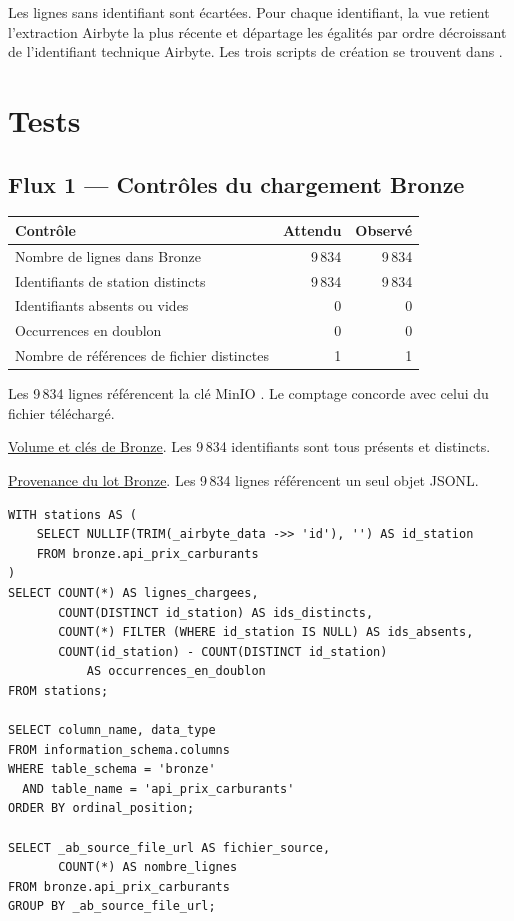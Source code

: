 \documentclass[11pt,a4paper]{article}
\newcommand{\preuve}[2]{%
  \href{https://github.com/MAHDIghr/projet_big_data_starter/blob/27cc8348f6737a75bb24a40d6d8cda3ae54996b3/preuves/#1}{\textcolor{encre}{\underline{#2}}}}
\begin{document}
Les lignes sans identifiant sont écartées. Pour chaque identifiant, la
vue retient l'extraction Airbyte la plus récente et départage les
égalités par ordre décroissant de l'identifiant technique Airbyte.
Les trois scripts de création se trouvent dans .

\section{Tests}

\subsection{Flux 1 --- Contrôles du chargement Bronze}

{\small
\begin{tabularx}{\linewidth}{@{}Xrr@{}}
\toprule
Contrôle & Attendu & Observé \\
\midrule
Nombre de lignes dans Bronze & 9\,834 & 9\,834 \\
Identifiants de station distincts & 9\,834 & 9\,834 \\
Identifiants absents ou vides & 0 & 0 \\
Occurrences en doublon & 0 & 0 \\
Nombre de références de fichier distinctes & 1 & 1 \\
\bottomrule
\end{tabularx}
}

Les 9\,834 lignes référencent la clé MinIO
.
Le comptage concorde avec celui du fichier téléchargé.

\preuve{api/api_08_carburants_controle_bronze.png}{Volume et clés de Bronze}. Les 9\,834 identifiants sont tous
présents et distincts.

\preuve{api/api_09_carburants_provenance_bronze.png}{Provenance du lot Bronze}. Les 9\,834 lignes référencent
un seul objet JSONL.

\begin{Verbatim}[fontsize=\small]
WITH stations AS (
    SELECT NULLIF(TRIM(_airbyte_data ->> 'id'), '') AS id_station
    FROM bronze.api_prix_carburants
)
SELECT COUNT(*) AS lignes_chargees,
       COUNT(DISTINCT id_station) AS ids_distincts,
       COUNT(*) FILTER (WHERE id_station IS NULL) AS ids_absents,
       COUNT(id_station) - COUNT(DISTINCT id_station)
           AS occurrences_en_doublon
FROM stations;

SELECT column_name, data_type
FROM information_schema.columns
WHERE table_schema = 'bronze'
  AND table_name = 'api_prix_carburants'
ORDER BY ordinal_position;

SELECT _ab_source_file_url AS fichier_source,
       COUNT(*) AS nombre_lignes
FROM bronze.api_prix_carburants
GROUP BY _ab_source_file_url;
\end{Verbatim}
\end{document}
